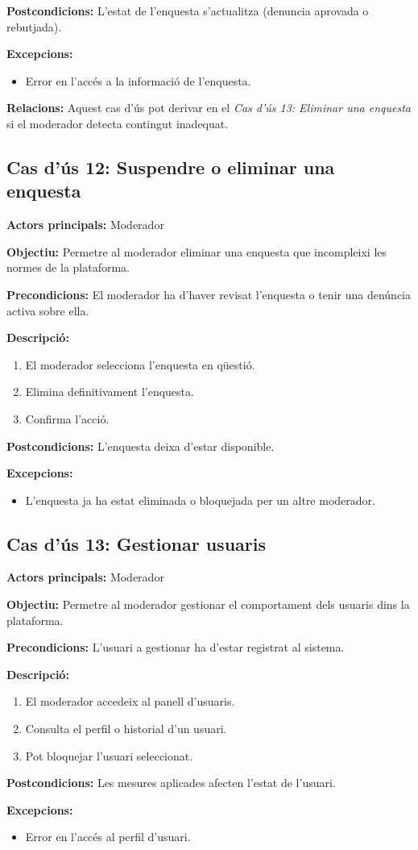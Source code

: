 \documentclass[../main.tex]{subfiles}
\begin{document}
\textbf{Postcondicions:}  
L’estat de l’enquesta s’actualitza (denuncia aprovada o rebutjada).

\textbf{Excepcions:}
\begin{itemize}
    \item Error en l’accés a la informació de l’enquesta.
\end{itemize}
\textbf{Relacions:}  
Aquest cas d'ús pot derivar en el \textit{Cas d'ús 13: Eliminar una enquesta} si el moderador detecta contingut inadequat.


\subsection*{Cas d’ús 12: Suspendre o eliminar una enquesta}

\textbf{Actors principals:} Moderador

\textbf{Objectiu:} Permetre al moderador eliminar una enquesta que incompleixi les normes de la plataforma.

\textbf{Precondicions:}  
El moderador ha d’haver revisat l’enquesta o tenir una denúncia activa sobre ella.

\textbf{Descripció:}
\begin{enumerate}
    \item El moderador selecciona l’enquesta en qüestió.
    \item Elimina definitivament l’enquesta.
    \item Confirma l’acció.
\end{enumerate}

\textbf{Postcondicions:}  
L’enquesta deixa d’estar disponible.

\textbf{Excepcions:}
\begin{itemize}
    \item L’enquesta ja ha estat eliminada o bloquejada per un altre moderador.
\end{itemize}

\subsection*{Cas d’ús 13: Gestionar usuaris}

\textbf{Actors principals:} Moderador

\textbf{Objectiu:} Permetre al moderador gestionar el comportament dels usuaris dins la plataforma.

\textbf{Precondicions:}  
L’usuari a gestionar ha d’estar registrat al sistema.

\textbf{Descripció:}
\begin{enumerate}
    \item El moderador accedeix al panell d’usuaris.
    \item Consulta el perfil o historial d’un usuari.
    \item Pot bloquejar l'usuari seleccionat.
\end{enumerate}

\textbf{Postcondicions:}  
Les mesures aplicades afecten l’estat de l’usuari.

\textbf{Excepcions:}
\begin{itemize}
    \item Error en l’accés al perfil d’usuari.
\end{itemize}
\end{document}
